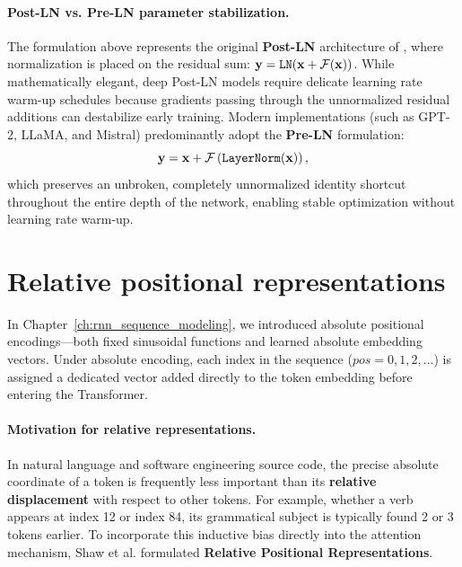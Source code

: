 \documentclass[../../main.tex]{subfiles}
\begin{document}
\paragraph{Post-LN vs. Pre-LN parameter stabilization.}
The formulation above represents the original \textbf{Post-LN} architecture of \cite{vaswani2017}, where normalization is placed on the residual sum: $\mathbf{y} = \text{\texttt{LN}}(\mathbf{x} + \mathcal{F}(\mathbf{x}))$.
While mathematically elegant, deep Post-LN models require delicate learning rate warm-up schedules because gradients passing through the unnormalized residual additions can destabilize early training.
Modern implementations (such as GPT-2, LLaMA, and Mistral) predominantly adopt the \textbf{Pre-LN} formulation:
\begin{equation}
\label{eq:pre_ln_formula}
\mathbf{y} = \mathbf{x} + \mathcal{F}\left(\text{\texttt{LayerNorm}}(\mathbf{x})\right),
\end{equation}
which preserves an unbroken, completely unnormalized identity shortcut throughout the entire depth of the network, enabling stable optimization without learning rate warm-up.

\clearpage
\section{Relative positional representations}
\label{sec:relative_positional_embeddings}

In Chapter~\ref{ch:rnn_sequence_modeling}, we introduced absolute positional encodings---both fixed sinusoidal functions \cite{vaswani2017} and learned absolute embedding vectors. Under absolute encoding, each index in the sequence ($pos = 0, 1, 2, \dots$) is assigned a dedicated vector added directly to the token embedding before entering the Transformer.

\paragraph{Motivation for relative representations.}
In natural language and software engineering source code, the precise absolute coordinate of a token is frequently less important than its \textbf{relative displacement} with respect to other tokens. For example, whether a verb appears at index 12 or index 84, its grammatical subject is typically found 2 or 3 tokens earlier.
To incorporate this inductive bias directly into the attention mechanism, Shaw et al. \cite{shaw2018} formulated \textbf{Relative Positional Representations}.
\end{document}
